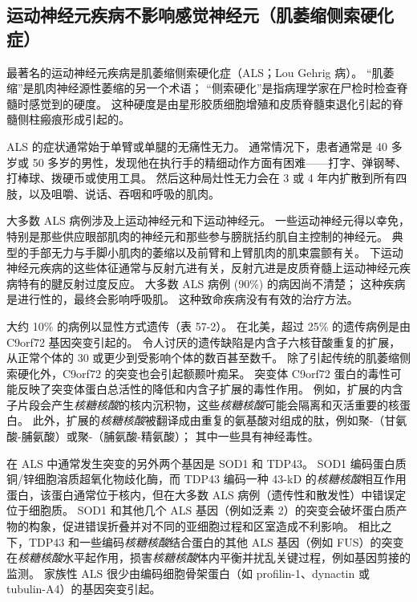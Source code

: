 \subsection{运动神经元疾病不影响感觉神经元（肌萎缩侧索硬化症）}

最著名的运动神经元疾病是肌萎缩侧索硬化症（ALS；Lou Gehrig 病）。
“肌萎缩”是肌肉神经源性萎缩的另一个术语；
“侧索硬化”是指病理学家在尸检时检查脊髓时感觉到的硬度。
这种硬度是由星形胶质细胞增殖和皮质脊髓束退化引起的脊髓侧柱瘢痕形成引起的。


ALS 的症状通常始于单臂或单腿的无痛性无力。
通常情况下，患者通常是 40 多岁或 50 多岁的男性，发现他在执行手的精细动作方面有困难——打字、弹钢琴、打棒球、拨硬币或使用工具。
然后这种局灶性无力会在 3 或 4 年内扩散到所有四肢，以及咀嚼、说话、吞咽和呼吸的肌肉。


大多数 ALS 病例涉及上运动神经元和下运动神经元。
一些运动神经元得以幸免，特别是那些供应眼部肌肉的神经元和那些参与膀胱括约肌自主控制的神经元。
典型的手部无力与手脚小肌肉的萎缩以及前臂和上臂肌肉的肌束震颤有关。
下运动神经元疾病的这些体征通常与反射亢进有关，反射亢进是皮质脊髓上运动神经元疾病特有的腱反射过度反应。
大多数 ALS 病例 (90\%) 的病因尚不清楚；
这种疾病是进行性的，最终会影响呼吸肌。
这种致命疾病没有有效的治疗方法。


大约 10\% 的病例以显性方式遗传（表 57-2）。
在北美，超过 25\% 的遗传病例是由 C9orf72 基因突变引起的。
令人讨厌的遗传缺陷是内含子六核苷酸重复的扩展，从正常个体的 30 或更少到受影响个体的数百甚至数千。
除了引起传统的肌萎缩侧索硬化外，C9orf72 的突变也会引起额颞叶痴呆。
突变体 C9orf72 蛋白的毒性可能反映了突变体蛋白总活性的降低和内含子扩展的毒性作用。
例如，扩展的内含子片段会产生\textit{核糖核酸}的核内沉积物，这些\textit{核糖核酸}可能会隔离和灭活重要的核蛋白。
此外，扩展的\textit{核糖核酸}被翻译成由重复的氨基酸对组成的肽，例如聚-（甘氨酸-脯氨酸）或聚-（脯氨酸-精氨酸）；
其中一些具有神经毒性。


在 ALS 中通常发生突变的另外两个基因是 SOD1 和 TDP43。
SOD1 编码蛋白质铜/锌细胞溶质超氧化物歧化酶，而 TDP43 编码一种 43-kD 的\textit{核糖核酸}相互作用蛋白，该蛋白通常位于核内，但在大多数 ALS 病例（遗传性和散发性）中错误定位于细胞质。
SOD1 和其他几个 ALS 基因（例如泛素 2）的突变会破坏蛋白质产物的构象，促进错误折叠并对不同的亚细胞过程和区室造成不利影响。
相比之下，TDP43 和一些编码\textit{核糖核酸}结合蛋白的其他 ALS 基因（例如 FUS）的突变在\textit{核糖核酸}水平起作用，损害\textit{核糖核酸}体内平衡并扰乱关键过程，例如基因剪接的监测。
家族性 ALS 很少由编码细胞骨架蛋白（如 profilin-1、dynactin 或 tubulin-A4）的基因突变引起。


